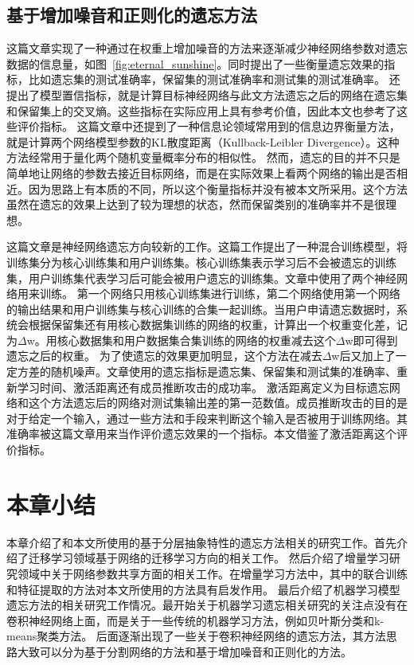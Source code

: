 \subsection{基于增加噪音和正则化的遗忘方法}
这篇文章\cite{Golatkar_2020_CVPR}实现了一种通过在权重上增加噪音的方法来逐渐减少神经网络参数对遗忘数据的信息量，如图~\ref{fig:eternal_sunshine}。同时提出了一些衡量遗忘效果的指标，比如遗忘集的测试准确率，保留集的测试准确率和测试集的测试准确率。
还提出了模型置信指标，就是计算目标神经网络与此文方法遗忘之后的网络在遗忘集和保留集上的交叉熵。这些指标在实际应用上具有参考价值，因此本文也参考了这些评价指标。
这篇文章中还提到了一种信息论领域常用到的信息边界衡量方法，就是计算两个网络模型参数的KL散度距离（Kullback-Leibler Divergence）。这种方法经常用于量化两个随机变量概率分布的相似性。
然而，遗忘的目的并不只是简单地让网络的参数去接近目标网络，而是在实际效果上看两个网络的输出是否相近。因为思路上有本质的不同，所以这个衡量指标并没有被本文所采用。这个方法虽然在遗忘的效果上达到了较为理想的状态，然而保留类别的准确率并不是很理想。

这篇文章\cite{Golatkar_2021_CVPR}是神经网络遗忘方向较新的工作。这篇工作提出了一种混合训练模型，将训练集分为核心训练集和用户训练集。核心训练集表示学习后不会被遗忘的训练集，用户训练集代表学习后可能会被用户遗忘的训练集。文章中使用了两个神经网络用来训练。
第一个网络只用核心训练集进行训练，第二个网络使用第一个网络的输出结果和用户训练集与核心训练的合集一起训练。当用户申请遗忘数据时，系统会根据保留集还有用核心数据集训练的网络的权重，计算出一个权重变化差，记为$\Delta$w。用核心数据集和用户数据集合集训练的网络的权重减去这个$\Delta$w即可得到遗忘之后的权重。
为了使遗忘的效果更加明显，这个方法在减去$\Delta$w后又加上了一定方差的随机噪声。文章使用的遗忘指标是遗忘集、保留集和测试集的准确率、重新学习时间、激活距离还有成员推断攻击的成功率。
激活距离定义为目标遗忘网络和这个方法遗忘后的网络对测试集输出差的第一范数值。成员推断攻击的目的是对于给定一个输入，通过一些方法和手段来判断这个输入是否被用于训练网络。其准确率被这篇文章用来当作评价遗忘效果的一个指标。本文借鉴了激活距离这个评价指标。

\section{本章小结}
本章介绍了和本文所使用的基于分层抽象特性的遗忘方法相关的研究工作。首先介绍了迁移学习领域基于网络的迁移学习方向的相关工作。
然后介绍了增量学习研究领域中关于网络参数共享方面的相关工作。在增量学习方法中，其中的联合训练和特征提取的方法对本文所使用的方法具有启发作用。
最后介绍了机器学习模型遗忘方法的相关研究工作情况。最开始关于机器学习遗忘相关研究的关注点没有在卷积神经网络上面，而是关于一些传统的机器学习方法，例如贝叶斯分类和k-means聚类方法。
后面逐渐出现了一些关于卷积神经网络的遗忘方法，其方法思路大致可以分为基于分割网络的方法和基于增加噪音和正则化的方法。
